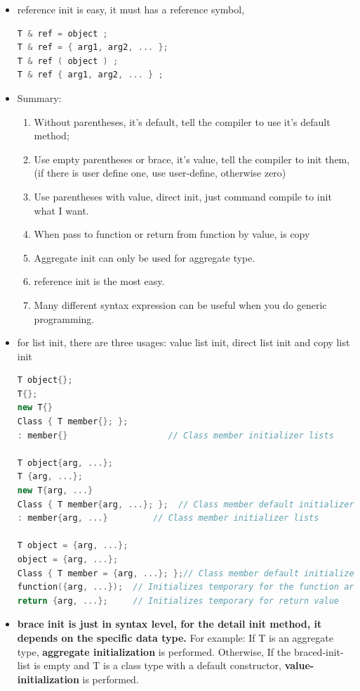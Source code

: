\documentclass[a4paper,11pt,twoside]{book}
\begin{document}
\begin{itemize}
\item reference init is easy, it must has a reference symbol, 
\begin{lstlisting}[frame=single, language=c++]
T & ref = object ;
T & ref = { arg1, arg2, ... };
T & ref ( object ) ;
T & ref { arg1, arg2, ... } ;
\end{lstlisting}
	\item Summary:
\begin{enumerate}
	\item Without parentheses, it's default, tell the compiler to use it's default method;
	\item Use empty parentheses or brace, it's value, tell the compiler to init them, (if there is user define one, use user-define, otherwise zero)
	\item Use parentheses with value, direct init, just command compile to init what I want.
	\item When pass to function or return from function by value, is copy
	\item Aggregate init can only be used for aggregate type.
	\item reference init is the most easy.
	\item Many different syntax expression can be useful when you do generic programming.
\end{enumerate}
	
\item for list init, there are three usages: value list init, direct list init and copy list init
\begin{lstlisting}[frame=single, language=c++]
T object{};
T{};
new T{}
Class { T member{}; };
: member{}                    // Class member initializer lists

T object{arg, ...};
T {arg, ...};
new T{arg, ...}
Class { T member{arg, ...}; };  // Class member default initializer
: member{arg, ...}         // Class member initializer lists

T object = {arg, ...};
object = {arg, ...};
Class { T member = {arg, ...}; };// Class member default initializer
function({arg, ...});  // Initializes temporary for the function arg
return {arg, ...};     // Initializes temporary for return value
\end{lstlisting}
\item \textbf{brace init is just in syntax level, for the detail init method, it depends on the specific data type.}  For example: If T is an aggregate type, \textbf{aggregate initialization} is performed. Otherwise, If the braced-init-list is empty and T is a class type with a default constructor, \textbf{value-initialization} is performed.

\end{itemize}
\end{document}
